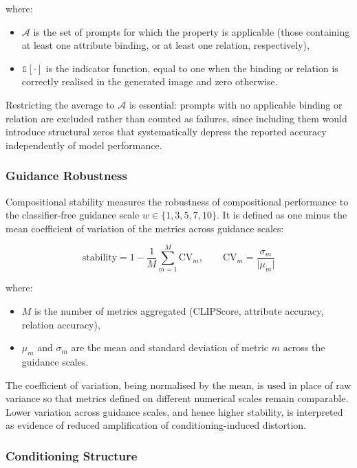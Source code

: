 \documentclass[a4paper,twoside,12pt]{report}
\begin{document}
where:
\begin{itemize}
  \item \(\mathcal{A}\) is the set of prompts for which the property is
        applicable (those containing at least one attribute binding, or at
        least one relation, respectively),
  \item \(\mathbb{1}[\cdot]\) is the indicator function, equal to one when the
        binding or relation is correctly realised in the generated image and
        zero otherwise.
\end{itemize}

Restricting the average to \(\mathcal{A}\) is essential: prompts with no
applicable binding or relation are excluded rather than counted as failures,
since including them would introduce structural zeros that systematically
depress the reported accuracy independently of model performance.

\subsubsection{Guidance Robustness}

Compositional stability measures the robustness of compositional performance to
the classifier-free guidance scale \(w \in \{1, 3, 5, 7, 10\}\). It is defined as
one minus the mean coefficient of variation of the metrics across guidance
scales:

\begin{equation}
\mathrm{stability}
= 1 - \frac{1}{M} \sum_{m=1}^{M} \mathrm{CV}_m,
\qquad
\mathrm{CV}_m = \frac{\sigma_m}{\lvert \mu_m \rvert}
\label{eq:stability}
\end{equation}

where:
\begin{itemize}
  \item \(M\) is the number of metrics aggregated (CLIPScore, attribute
        accuracy, relation accuracy),
  \item \(\mu_m\) and \(\sigma_m\) are the mean and standard deviation of
        metric \(m\) across the guidance scales.
\end{itemize}

The coefficient of variation, being normalised by the mean, is used in place of
raw variance so that metrics defined on different numerical scales remain
comparable. Lower variation across guidance scales, and hence higher stability,
is interpreted as evidence of reduced amplification of conditioning-induced
distortion.

\subsubsection{Conditioning Structure}
\end{document}
